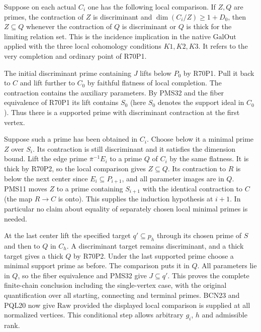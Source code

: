 Suppose on each actual $C_i$ one has the following local comparison.
If $Z,Q$ are primes, the contraction of $Z$ is discriminant and
$\dim(C_i/Z)\ge1+D_0$, then $Z\subseteq Q$ whenever the
contraction of $Q$ is discriminant or $Q$ is thick for the
limiting relation set. This is the incidence implication in the
native $\mathrm{GalOut}$ applied with the three local cohomology
conditions $K1,K2,K3$. It refers to the very completion and
ordinary point of R70P1.

The initial discriminant prime containing $J$ lifts below $P_0$
by R70P1. Pull it back to $C$ and lift further to $C_0$ by
faithful flatness of local completion. The contraction contains
the auxiliary parameters. By PMS32 and the fiber equivalence
of R70P1 its lift contains $S_0$ (here $S_0$ denotes the support
ideal in $C_0$). Thus there is a supported prime with discriminant
contraction at the first vertex.

Suppose such a prime has been obtained in $C_i$. Choose below it
a minimal prime $Z$ over $S_i$. Its contraction is still
discriminant and it satisfies the dimension bound. Lift the edge
prime $\bar\pi^{-1}E_i$ to a prime $Q$ of $C_i$ by the same
flatness. It is thick by R70P2, so the local comparison gives
$Z\subseteq Q$. Its contraction to $R$ is below the next center
since $E_i\subseteq P_{i+1}$, and all parameter images are in
$Q$. PMS11 moves $Z$ to a prime containing $S_{i+1}$ with the
identical contraction to $C$ (the map $R\to C$ is onto).
This supplies the induction hypothesis at $i+1$. In particular
no claim about equality of separately chosen local minimal
primes is needed.

At the last center lift the specified target $q'\subseteq p_h$
through its chosen prime of $S$ and then to $Q$ in $C_h$.
A discriminant target remains discriminant, and a thick target
gives a thick $Q$ by R70P2. Under the last supported prime
choose a minimal support prime as before. The comparison puts it
in $Q$. All parameters lie in $Q$, so the fiber equivalence and
PMS32 give $J\subseteq q'$. This proves the complete finite-chain
conclusion including the single-vertex case, with the original
quantification over all starting, connecting and terminal primes.
BCN23 and PQL20 now give $\mathrm{Raw}$ provided the displayed local
comparison is supplied at all normalized vertices. This conditional
step allows arbitrary $g_i$, $h$ and admissible rank.

